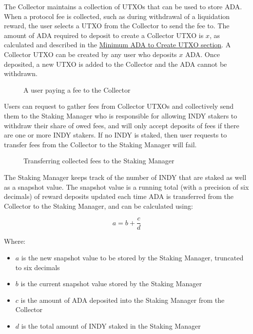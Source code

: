 \documentclass{article}
\begin{document}
\begin{sloppypar}
The Collector maintains a collection of UTXOs that can be used to store
ADA. When a protocol fee is collected, such as during withdrawal of a
liquidation reward, the user selects a UTXO from the Collector to send
the fee to. The amount of ADA required to deposit to create a Collector
UTXO is \(x\), as calculated and described in the
\protect\hyperlink{minimum-ada-to-create-utxo}{Minimum ADA to Create
UTXO section}. A Collector UTXO can be created by any user who deposits
\(x\) ADA. Once deposited, a new UTXO is added to the Collector and the
ADA cannot be withdrawn.

\hypertarget{collector-utxo}{%
\begin{figure}[htbp]
\centering

\caption{A user paying a fee to the Collector}
\label{collector-utxo}
\end{figure}}

Users can request to gather fees from Collector UTXOs and collectively
send them to the Staking Manager who is responsible for allowing INDY
stakers to withdraw their share of owed fees, and will only accept
deposits of fees if there are one or more INDY stakers. If no INDY is
staked, then user requests to transfer fees from the Collector to the
Staking Manager will fail.

\hypertarget{collector-staking-manager}{%
\begin{figure}[htbp]
\centering

\caption{Transferring collected fees to the Staking Manager}
\label{collector-staking-manager}
\end{figure}}

\filbreak

The Staking Manager keeps track of the number of INDY that are staked as
well as a snapshot value. The snapshot value is a running total (with a
precision of six decimals) of reward deposits updated each time ADA is
transferred from the Collector to the Staking Manager, and can be
calculated using:

\[a = b + \frac{c}{d}\]

Where:

\begin{itemize}
\item
  \(a\) is the new snapshot value to be stored by the Staking Manager,
  truncated to six decimals
\item
  \(b\) is the current snapshot value stored by the Staking Manager
\item
  \(c\) is the amount of ADA deposited into the Staking Manager from the
  Collector
\item
  \(d\) is the total amount of INDY staked in the Staking Manager
\end{itemize}


\end{sloppypar}
\end{document}
